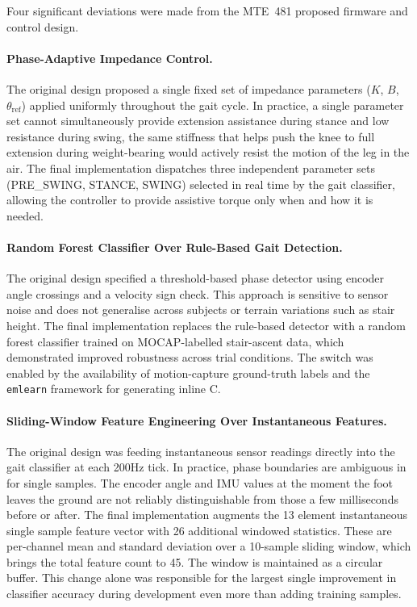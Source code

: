 \documentclass[11pt]{article}
\begin{document}
Four significant deviations were made from the MTE~481 proposed firmware and control design.

\paragraph{Phase-Adaptive Impedance Control.}

The original design proposed a single fixed set of impedance parameters ($K$, $B$, $\theta_\text{ref}$) applied uniformly throughout the gait cycle.
In practice, a single parameter set cannot simultaneously provide extension assistance during stance and low resistance during swing, 
the same stiffness that helps push the knee to full extension during weight-bearing would actively resist the motion of the leg in the air.
The final implementation dispatches three independent parameter sets (PRE\_SWING, STANCE, SWING) selected in real time by the gait classifier, allowing the controller to provide assistive torque only when and how it is needed.

\paragraph{Random Forest Classifier Over Rule-Based Gait Detection.}

The original design specified a threshold-based phase detector using encoder angle crossings and a velocity sign check.
This approach is sensitive to sensor noise and does not generalise across subjects or terrain variations such as stair height.
The final implementation replaces the rule-based detector with a random forest classifier trained on MOCAP-labelled stair-ascent data, which demonstrated improved robustness across trial conditions.
The switch was enabled by the availability of motion-capture ground-truth labels and the \verb|emlearn| framework for generating inline C.

\paragraph{Sliding-Window Feature Engineering Over Instantaneous Features.}

The original design was feeding instantaneous sensor readings directly into the gait classifier at each 200Hz tick.
In practice, phase boundaries are ambiguous in for single samples. 
The encoder angle and IMU values at the moment the foot leaves the ground are not reliably distinguishable from those a few milliseconds before or after.
The final implementation augments the 13 element instantaneous single sample feature vector with 26 additional windowed statistics. 
These are per-channel mean and standard deviation over a 10-sample sliding window, which brings the total feature count to 45.
The window is maintained as a circular buffer.
This change alone was responsible for the largest single improvement in classifier accuracy during development even more than adding training samples.
\end{document}
